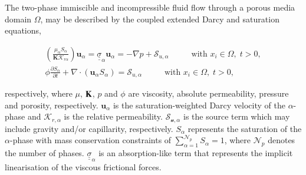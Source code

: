 \documentclass[preprint,authoryear,12pt]{elsarticle}
\begin{document}

The two-phase immiscible and incompressible fluid flow through a porous media domain $\Omega$, may be described by the coupled extended Darcy and saturation equations,

\begin{eqnarray}
\left(\displaystyle\frac{\mu_{\alpha}S_{\alpha}}{{\mathbf K}\mathcal{K}_{r\alpha}}\right) {\mathbf u}_{\alpha} = \underline{\underline{\sigma}}_{\alpha} {\mathbf u}_{\alpha} = -\nabla p + \mathcal{S}_{u,\alpha}\hspace{1cm} \text{ with } x_{i}\in\Omega,\; t>0, \label{eqn:darcy_eqn} \\
\phi\displaystyle\frac{\partial S_{\alpha} }{\partial t} +   \nabla \cdot \left( {\mathbf u}_{\alpha}  S_{\alpha}\right) =  \mathcal{S}_{u,\alpha}\hspace{1cm} \text{ with } x_{i}\in\Omega,\; t>0,\label{eqn:saturation_eqn}
\end{eqnarray} 

\noindent respectively, where $\mu$, ${\bf K}$, $p$ and $\phi$ are viscosity, absolute permeability, pressure and porosity, respectively. ${\mathbf u}_{\alpha}$ is the saturation-weighted Darcy velocity of the $\alpha$-phase and $\mathcal{K}_{r,\alpha}$ is the relative permeability. $\mathcal{S_{u,{\alpha}}}$ is the source term %
which may include gravity and/or capillarity, respectively. $S_{\alpha}$ represents the saturation of the $\alpha$-phase with mass conservation constraints of $\sum\limits_{\alpha=1}^{\mathcal{N}_{p}} S_{\alpha} = 1$, where $\mathcal{N}_{p}$ denotes the number of phases. $\underline{\underline{\sigma}}_{\alpha}$ is an absorption-like term that represents the implicit linearisation of the viscous frictional forces.
\end{document}
